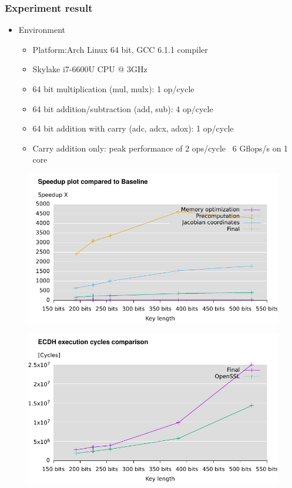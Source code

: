 \begin{frame}
  \frametitle{Experiment result}
  \begin{itemize}
  \item{Environment
  \begin{itemize}
  \setlength\itemsep{0.5em}
  \item{Platform:Arch Linux 64 bit, GCC 6.1.1 compiler}
  \item{Skylake i7-6600U CPU @ 3GHz}
  \item{64 bit multiplication (mul, mulx): 1 op/cycle}
  \item{64 bit addition/subtraction (add, sub): 4 op/cycle}
  \item{64 bit addition with carry (adc, adcx, adox): 1 op/cycle}
  \item{Carry addition only: peak performance of 2 ops/cycle ~6 Gflops/s on 1 core}
  \end{itemize}
}
  \setlength\itemsep{1.5em}
  \end{itemize}
\end{frame}
\begin{frame}
\begin{figure}\flushleft		
\includegraphics[scale=0.9, trim={0 0 0 0}]{speedup}		
\end{figure}
\end{frame}
\begin{frame}
\begin{figure}\flushleft		
\includegraphics[scale=0.9, trim={0 0 0 0}]{ecdh}		
\end{figure}
\end{frame}
